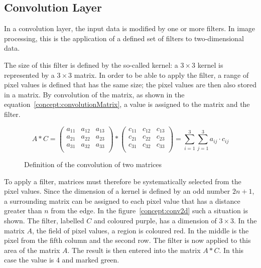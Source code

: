 {%



\subsection{Convolution Layer}\label{subsec:conv2d}

In a convolution layer, the input data is modified by one or more filters. In image processing, this is the application of a defined set of filters to two-dimensional data.

The size of this filter is defined by the so-called kernel: a $3 \times 3$ kernel is represented by a $3 \times 3$ matrix. In order to be able to apply the filter, a range of pixel values is defined that has the same size; the pixel values are then also stored in a matrix. By convolution of the matrix, as shown in the equation~\ref{concept:convolutionMatrix}, a value is assigned to the matrix and the filter. 
    
   
    \begin{figure}
        
        $$A \ast C 
        =
        \left(
        \begin{matrix}
            a_{11} & a_{12} & a_{13}\\
            a_{21} & a_{22} & a_{23}\\
            a_{31} & a_{32} & a_{33}\\
        \end{matrix}
        \right)
        \ast
        \left(
        \begin{matrix}
            c_{11} & c_{12} & c_{13}\\
            c_{21} & c_{22} & c_{23}\\
            c_{31} & c_{32} & c_{33}\\
        \end{matrix}
        \right)
        = 
        \sum_{i=1}^3\sum_{j=1}^3  a_{ij} \cdot c_{ij}
        $$
        
        \caption{Definition of the convolution of two matrices}\label{concept:FaltungMatrix}
        
    \end{figure}
 
 To apply a filter, matrices must therefore be systematically selected from the pixel values. Since the dimension of a kernel is defined by an odd number $2n+1$, a surrounding matrix can be assigned to each pixel value that has a distance greater than $n$ from the edge. In the figure~\ref{concept:conv2d} such a situation is shown. The filter, labelled $C$ and coloured purple, has a dimension of $3 \times 3$. In the matrix $A$, the field of pixel values, a region is coloured red. In the middle is the pixel from the fifth column and the second row. The filter is now applied to this area of the matrix $A$. The result is then entered into the matrix $A\ast C$. In this case the value is $4$ and marked green.
 
}
